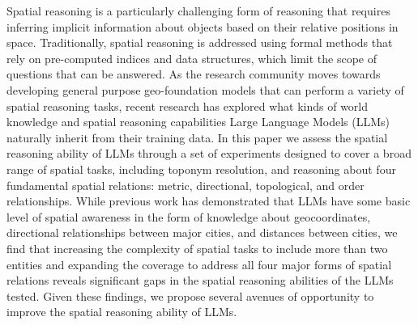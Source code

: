 
Spatial reasoning is a particularly challenging form of reasoning that requires inferring implicit information about objects based on their relative positions in space.
Traditionally, spatial reasoning is addressed using formal methods that rely on pre-computed indices and data structures, which limit the scope of questions that can be answered.
As the research community moves towards developing general purpose geo-foundation models that can perform a variety of spatial reasoning tasks, recent research has explored what kinds of world knowledge and spatial reasoning capabilities Large Language Models (LLMs) naturally inherit from their training data.
In this paper we assess the spatial reasoning ability of LLMs through a set of experiments designed to cover a broad range of spatial tasks, including toponym resolution, and reasoning about four fundamental spatial relations: metric, directional, topological, and order relationships.
While previous work has demonstrated that LLMs have some basic level of spatial awareness in the form of knowledge about geocoordinates, directional relationships between major cities, and distances between cities, we find that increasing the complexity of spatial tasks to include more than two entities and expanding the coverage to address all four major forms of spatial relations reveals significant gaps in the spatial reasoning abilities of the LLMs tested.
Given these findings, we propose several avenues of opportunity to improve the spatial reasoning ability of LLMs.




